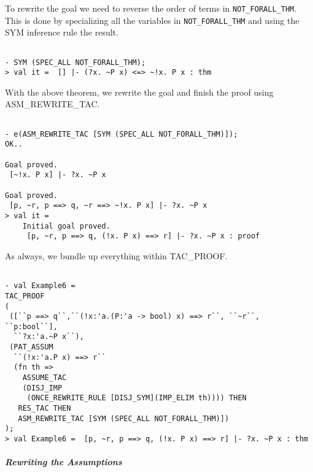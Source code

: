 To rewrite the goal we need to reverse the order of terms in
\verb|NOT_FORALL_THM|. This is done by specializing all the variables
in \verb|NOT_FORALL_THM| and using the SYM inference rule the result.
\begin{session}
  \begin{scriptsize}
\begin{verbatim}

- SYM (SPEC_ALL NOT_FORALL_THM);
> val it =  [] |- (?x. ~P x) <=> ~!x. P x : thm
\end{verbatim}
  \end{scriptsize}
\end{session}
With the above theorem, we rewrite the goal and finish the proof using
ASM\_REWRITE_TAC.
\begin{session}
  \begin{scriptsize}
\begin{verbatim}

- e(ASM_REWRITE_TAC [SYM (SPEC_ALL NOT_FORALL_THM)]);
OK..

Goal proved.
 [~!x. P x] |- ?x. ~P x

Goal proved.
 [p, ~r, p ==> q, ~r ==> ~!x. P x] |- ?x. ~P x
> val it =
    Initial goal proved.
     [p, ~r, p ==> q, (!x. P x) ==> r] |- ?x. ~P x : proof
\end{verbatim}
  \end{scriptsize}
\end{session}
As always, we bundle up everything within TAC\_PROOF.
\begin{session}
  \begin{scriptsize}
\begin{verbatim}

- val Example6 =
TAC_PROOF
(
 ([``p ==> q``,``(!x:'a.(P:'a -> bool) x) ==> r``, ``~r``, ``p:bool``],
  ``?x:'a.~P x``),
 (PAT_ASSUM 
  ``(!x:'a.P x) ==> r``
  (fn th => 
    ASSUME_TAC 
    (DISJ_IMP 
     (ONCE_REWRITE_RULE [DISJ_SYM](IMP_ELIM th)))) THEN
   RES_TAC THEN
   ASM_REWRITE_TAC [SYM (SPEC_ALL NOT_FORALL_THM)])
);
> val Example6 =  [p, ~r, p ==> q, (!x. P x) ==> r] |- ?x. ~P x : thm
\end{verbatim}
  \end{scriptsize}
\end{session}

\subparagraph{Rewriting the Assumptions}

